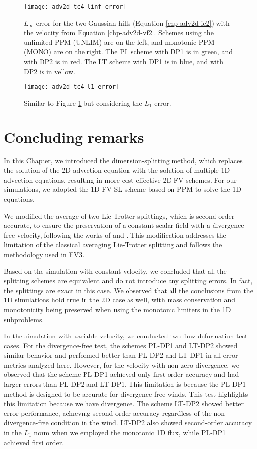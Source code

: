 \newpage
\begin{figure}[!htb]
	\centering
	\texttt{[image: adv2d\_tc4\_linf\_error]}
	\caption{$L_{\infty}$ error for the two Gaussian hills (Equation \ref{chp-adv2d-ic2})
			with the velocity from Equation \eqref{chp-adv2d-vf2}.
			Schemes using the unlimited PPM (UNLIM) are on the left, and monotonic PPM (MONO) are on the right.
			The PL scheme with DP1 is in green, and with DP2 is in red. 
			The LT scheme with DP1 is in blue, and with DP2 is in yellow.\label{chp-adv2d-sec-exp-adv3-error-linf}}
\end{figure}

\begin{figure}[!htb]
	\centering
	\texttt{[image: adv2d\_tc4\_l1\_error]}
	\caption{Similar to Figure \ref{chp-adv2d-sec-exp-adv3-error-linf} but considering the $L_1$ error.
		\label{chp-adv2d-sec-exp-adv3-error-l1}}
\end{figure}

\newpage
\section{Concluding remarks}
\label{chp-2d-fv-conc}
In this Chapter, we introduced the dimension-splitting method, 
which replaces the solution of the 2D advection equation with the
solution of multiple 1D advection equations, resulting in more cost-effective 2D-FV schemes. 
For our simulations, we adopted the 1D FV-SL scheme based on PPM to solve the 1D equations.

We modified the average of two Lie-Trotter splittings, which is second-order accurate, 
to ensure the preservation of a constant scalar field with a divergence-free velocity,
following the works of \citet{lin:1996} and \citet{putman:2007}.
This modification addresses the limitation of the classical averaging Lie-Trotter splitting and follows the methodology used in FV3.

Based on the simulation with constant velocity, we concluded that all the splitting schemes
are equivalent and do not introduce any splitting errors. In fact, the splittings are exact in this case.
We observed that all the conclusions from the 1D simulations hold true in the 2D case as well,
with mass conservation and monotonicity being preserved when using the monotonic limiters in the 1D subproblems.

In the simulation with variable velocity, we conducted two flow deformation test cases.
For the divergence-free test, the schemes PL-DP1 and LT-DP2 showed similar behavior and performed better
than PL-DP2 and LT-DP1 in all error metrics analyzed here.
However, for the velocity with non-zero divergence, we observed that the scheme PL-DP1 achieved only
first-order accuracy and had larger errors than PL-DP2 and LT-DP1.
This limitation is because the PL-DP1 method is designed to be accurate for divergence-free winds.
This test highlights this limitation because we have divergence.
The scheme LT-DP2 showed better error performance, achieving second-order accuracy regardless of the non-divergence-free condition in the wind.
LT-DP2 also showed second-order accuracy in the $L_1$ norm when we employed the monotonic 1D flux, while PL-DP1 achieved first order.


